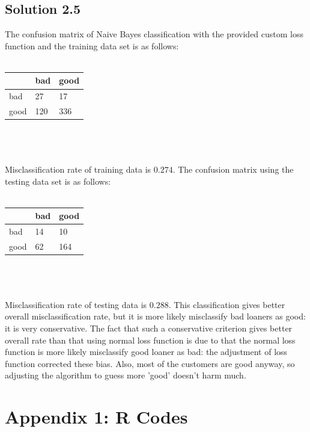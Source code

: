 \documentclass[11pt,english]{article}
\begin{document}
\subsection*{Solution 2.5}
The confusion matrix of Naive Bayes classification with the provided
custom loss function and the training data set is as follows:\\\\
\begin{tabular}{ l | l | l }
  & bad & good \\
  \hline
  bad & 27 & 17 \\
  good & 120 & 336
\end{tabular}
\\\\\\
Misclassification rate of training data is $0.274$.
The confusion matrix using the testing data set is as follows:\\\\
\begin{tabular}{ l | l | l }
  & bad & good \\
  \hline
  bad & 14 & 10 \\
  good & 62 & 164
\end{tabular}
\\\\\\
Misclassification rate of testing data is $0.288$. This classification
gives better overall misclassification rate, but it is more likely
misclassify bad loaners as good: it is very conservative. The fact that
such a conservative criterion gives better overall rate than that using
normal loss function is due to that the normal loss function is more
likely misclassify good loaner as bad: the adjustment of loss function
corrected these bias. Also, most of the customers are good anyway, so
adjusting the algorithm to guess more 'good' doesn't harm much.

\newpage
{}

\section*{Appendix 1: R Codes}
\label{ax1}

\end{document}
